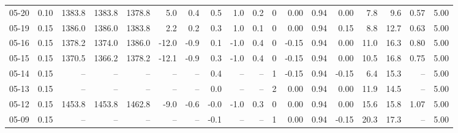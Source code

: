 \begin{threeparttable}
{\begin{tabular}{lrrrrrrrrrrrrrrrrr}
  05-20 &     0.10 & 1383.8 & 1383.8 & 1378.8 &        5.0 &            0.4 &                       0.5 &                      1.0 &                 0.2 &              0 &       0.00 &      0.94 &           0.00 &              7.8 &                 9.6 &            0.57 &                   5.00 \\
  05-19 &     0.15 & 1386.0 & 1386.0 & 1383.8 &        2.2 &            0.2 &                       0.3 &                      1.0 &                 0.1 &              0 &       0.00 &      0.94 &           0.15 &              8.8 &                12.7 &            0.63 &                   5.00 \\
  05-16 &     0.15 & 1378.2 & 1374.0 & 1386.0 &      -12.0 &           -0.9 &                       0.1 &                     -1.0 &                 0.4 &              0 &      -0.15 &      0.94 &           0.00 &             11.0 &                16.3 &            0.80 &                   5.00 \\
  05-15 &     0.15 & 1370.5 & 1366.2 & 1378.2 &      -12.1 &           -0.9 &                       0.3 &                     -1.0 &                 0.4 &              0 &      -0.15 &      0.94 &           0.00 &             10.5 &                16.8 &            0.75 &                   5.00 \\
  05-14 &     0.15 &     -- &     -- &     -- &         -- &             -- &                       0.4 &                       -- &                  -- &              1 &      -0.15 &      0.94 &          -0.15 &              6.4 &                15.3 &              -- &                   5.00 \\
  05-13 &     0.15 &     -- &     -- &     -- &         -- &             -- &                       0.0 &                       -- &                  -- &              2 &       0.00 &      0.94 &           0.00 &             11.9 &                14.5 &              -- &                   5.00 \\
  05-12 &     0.15 & 1453.8 & 1453.8 & 1462.8 &       -9.0 &           -0.6 &                      -0.0 &                     -1.0 &                 0.3 &              0 &       0.00 &      0.94 &           0.00 &             15.6 &                15.8 &            1.07 &                   5.00 \\
  05-09 &     0.15 &     -- &     -- &     -- &         -- &             -- &                      -0.1 &                       -- &                  -- &              1 &       0.00 &      0.94 &          -0.15 &             20.3 &                17.3 &              -- &                   5.00 \\

\end{tabular}}
\end{threeparttable}
